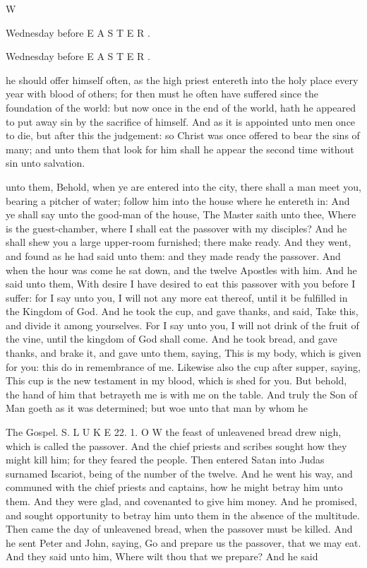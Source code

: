 W

Wednesday before E A S T E R .

Wednesday before E A S T E R .

he should offer himself often, as the high priest entereth into the holy place every year with blood of others; for then must he often have suffered since the foundation of the world: but now once in the end of the world, hath he appeared to put away sin by the sacrifice of himself. And as it is appointed unto men once to die, but after this the judgement: so Christ was once offered to bear the sins of many; and unto them that look for him shall he appear the second time without sin unto salvation.

unto them, Behold, when ye are entered into the city, there shall a man meet you, bearing a pitcher of water; follow him into the house where he entereth in: And ye shall say unto the good-man of the house, The Master saith unto thee, Where is the guest-chamber, where I shall eat the passover with my disciples? And he shall shew you a large upper-room furnished; there make ready. And they went, and found as he had said unto them: and they made ready the passover. And when the hour was come he sat down, and the twelve Apostles with him. And he said unto them, With desire I have desired to eat this passover with you before I suffer: for I say unto you, I will not any more eat thereof, until it be fulfilled in the Kingdom of God. And he took the cup, and gave thanks, and said, Take this, and divide it among yourselves. For I say unto you, I will not drink of the fruit of the vine, until the kingdom of God shall come. And he took bread, and gave thanks, and brake it, and gave unto them, saying, This is my body, which is given for you: this do in remembrance of me. Likewise also the cup after supper, saying, This cup is the new testament in my blood, which is shed for you. But behold, the hand of him that betrayeth me is with me on the table. And truly the Son of Man goeth as it was determined; but woe unto that man by whom he

The Gospel. S. L U K E 22. 1. O W the feast of unleavened bread drew nigh, which is called the passover. And the chief priests and scribes sought how they might kill him; for they feared the people. Then entered Satan into Judas surnamed Iscariot, being of the number of the twelve. And he went his way, and communed with the chief priests and captains, how he might betray him unto them. And they were glad, and covenanted to give him money. And he promised, and sought opportunity to betray him unto them in the absence of the multitude. Then came the day of unleavened bread, when the passover must be killed. And he sent Peter and John, saying, Go and prepare us the passover, that we may eat. And they said unto him, Where wilt thou that we prepare? And he said

